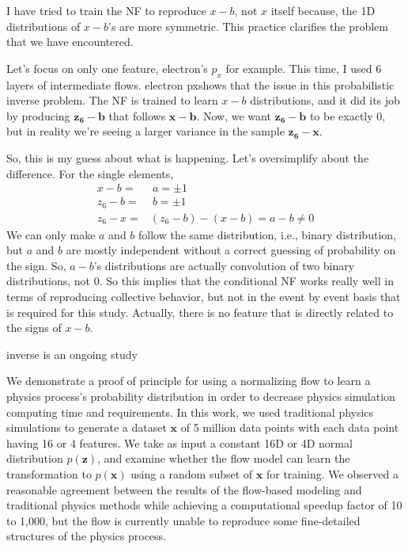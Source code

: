     
    I have tried to train the NF to reproduce $x-b$, not $x$ itself because, the 1D distributions of $x-b$'s are more symmetric. This practice clarifies the problem that we have encountered.
    
    Let's focus on only one feature, electron's $p_x$ for example. This time, I used 6 layers of intermediate flows. electron pxshows that the issue in this probabilistic inverse problem.
    The NF is trained to learn $x-b$ distributions, and it did its job by producing $\mathbf{z_6}-\mathbf{b}$ that follows $\mathbf{x}-\mathbf{b}$. Now, we want $\mathbf{z_6}-\mathbf{b}$ to be exactly 0, but in reality we're seeing a larger variance in the sample $\mathbf{z_6}-\mathbf{x}$.
    
    So, this is my guess about what is happening. Let's oversimplify about the difference. For the single elements,
    \begin{align}
        x -b =& ~a = \pm 1\\
        z_6-b =& ~b = \pm 1\\
        z_6 -x =& (z_6-b) - (x-b) = a- b \neq 0
    \end{align}
    We can only make $a$ and $b$ follow the same distribution, i.e., binary distribution, but $a$ and $b$ are mostly independent without a correct guessing of probability on the sign. So, $a-b$'s distributions are actually convolution of two binary distributions, not 0. So this implies that the conditional NF works really well in terms of reproducing collective behavior, but not in the event by event basis that is required for this study. Actually, there is no feature that is directly related to the signs of $x-b$.
    
    
    
    inverse is an ongoing study
    
    We demonstrate a proof of principle for using a normalizing flow to learn a physics process's probability distribution in order to decrease physics simulation computing time and requirements. In this work, we used traditional physics simulations to generate a dataset $\mathbf{x}$ of 5 million data points with each data point having 16 or 4 features.  We take as input a constant 16D or 4D normal distribution $p(\mathbf{z})$, and examine whether the flow model can learn the transformation to $p(\mathbf{x})$ using a random subset of $\mathbf{x}$ for training. We observed a reasonable agreement between the results of the flow-based modeling and traditional physics methods while achieving a computational speedup factor of 10 to 1,000, but the flow is currently unable to reproduce some fine-detailed structures of the physics process.
    
    
    \parencite{Radhakrishnan2020OverparameterizedMemory}